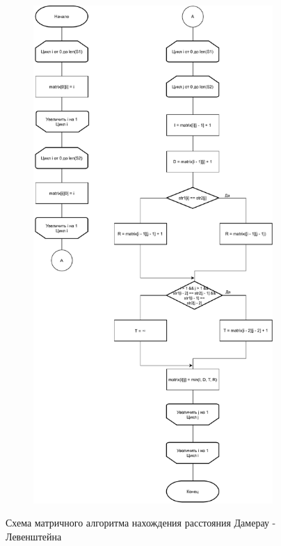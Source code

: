 \documentclass[12pt,a4paper,oneside]{report}
\begin{document}
\begin{figure}[H]
	\centering
	
	\begin{subfigure}[t]{.4\linewidth}
		\includegraphics[height=2.3\linewidth, width=1.2\linewidth]{damerau_levenshtein}
	\end{subfigure}
	\quad

	\caption{Схема матричного алгоритма нахождения расстояния Дамерау - Левенштейна}
\end{figure}
\end{document}
